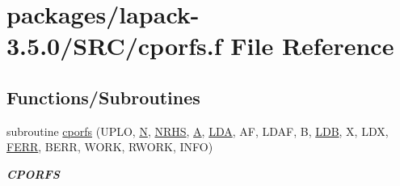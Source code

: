 \hypertarget{cporfs_8f}{}\section{packages/lapack-\/3.5.0/\+S\+R\+C/cporfs.f File Reference}
\label{cporfs_8f}
\subsection*{Functions/\+Subroutines}
\begin{DoxyCompactItemize}
\item 
subroutine \hyperlink{group__complexPOcomputational_ga29f47972e18ce3bc44ca5d8ee0cf7f28}{cporfs} (U\+P\+L\+O, \hyperlink{polmisc_8c_a0240ac851181b84ac374872dc5434ee4}{N}, \hyperlink{example__user_8c_aa0138da002ce2a90360df2f521eb3198}{N\+R\+H\+S}, \hyperlink{classA}{A}, \hyperlink{example__user_8c_ae946da542ce0db94dced19b2ecefd1aa}{L\+D\+A}, A\+F, L\+D\+A\+F, B, \hyperlink{example__user_8c_a50e90a7104df172b5a89a06c47fcca04}{L\+D\+B}, X, L\+D\+X, \hyperlink{superlu__enum__consts_8h_af00a42ecad444bbda75cde1b64bd7e72a78fd14d7abebae04095cfbe02928f153}{F\+E\+R\+R}, B\+E\+R\+R, W\+O\+R\+K, R\+W\+O\+R\+K, I\+N\+F\+O)
\begin{DoxyCompactList}\small\item\em {\bfseries C\+P\+O\+R\+F\+S} \end{DoxyCompactList}\end{DoxyCompactItemize}
